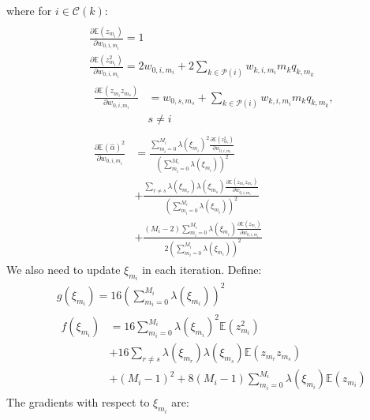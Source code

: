 \documentclass[review]{elsarticle}
\begin{document}
\noindent where for $i \in \mathcal{C}(k)$:
\begin{eqnarray*}
\end{eqnarray*}
\begin{eqnarray*}
&& \frac{\partial \mathbb{E}(z_{m_{i}})}{\partial w_{0, i, m_{i}}} = 1 \\
&& \frac{\partial \mathbb{E}(z_{m_{i}}^{2})}{\partial w_{0, i, m_{i}}} =
2w_{0, i, m_{i}} + 2\sum_{k \in \mathcal{P}(i)}w_{k, i, m_{i}}m_{k}q_{k, m_{k}} \\
&& 
\begin{aligned}
\frac{\partial \mathbb{E}(z_{m_{i}}z_{m_{s}})}{\partial w_{0, i, m_{i}}} & = w_{0,s,m_{s}} + \sum_{k \in \mathcal{P}(i)}w_{k, i, m_{i}}m_{k}q_{k, m_{k}}, \\
& s \neq i 
\end{aligned}
\\ 
&& 
\begin{aligned}
\frac{\partial \mathbb{E}(\hat{\alpha})^{2}}{\partial w_{0, i, m_{i}}} & = \frac{\sum_{m_{i} = 0}^{M_{i}}\lambda(\xi_{m_{i}})^{2}\frac{\partial \mathbb{E}(z_{m_{i}}^{2})}{\partial w_{0,i,m_{i}}}}{(\sum_{m_{i} = 0}^{M_{i}}\lambda(\xi_{m_{i}}))^{2}} \\
& + \frac{\sum_{r \neq s}\lambda(\xi_{m_{r}})\lambda(\xi_{m_{s}})
\frac{\partial \mathbb{E}(z_{m_{r}}z_{m_{s}})}{\partial w_{0,i,m_{i}}}}{(\sum_{m_{i} = 0}^{M_{i}}\lambda(\xi_{m_{i}}))^{2}}\\
& + \frac{(M_{i} - 2)\sum_{m_{i} = 0}^{M_{i}}
\lambda(\xi_{m_{i}})
\frac{\partial \mathbb{E}(z_{m_{i}})}{\partial w_{0,i,m_{i}}}
}{2(\sum_{m_{i} = 0}^{M_{i}}\lambda(\xi_{m_{i}}))^{2}}
\end{aligned}
\end{eqnarray*}
We also need to update $\xi_{m_{i}}$ in each iteration. Define: 
\begin{eqnarray*}
&& g(\xi_{m_{i}}) = 16(\sum_{m_{i} = 0}^{M_{i}}\lambda(\xi_{m_{i}}))^{2} \\
&&
\begin{aligned}
f(\xi_{m_{i}}) & =  16\sum_{m_{i} = 0}^{M_{i}}\lambda(\xi_{m_{i}})^{2}\mathbb{E}(z_{m_{i}}^{2}) \\
& + 16\sum_{r \neq s} \lambda(\xi_{m_{r}})\lambda(\xi_{m_{s}})\mathbb{E}(z_{m_{r}}z_{m_{s}}) \\
& + (M_{i} - 1)^{2} 
+ 8(M_{i} - 1)\sum_{m_{i} = 0}^{M_{i}}\lambda(\xi_{m_{i}})\mathbb{E}(z_{m_{i}})
\end{aligned}
\end{eqnarray*}
The gradients with respect to $\xi_{m_{i}}$ are:
\end{document}
